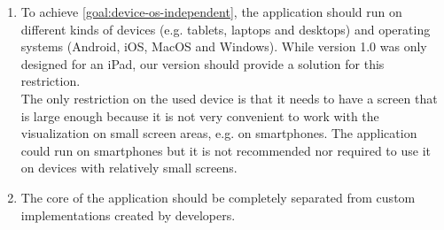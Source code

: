 \begin{enumerate}[label=\textbf{OR \arabic*}., ref=OR \arabic*, labelindent=0.5cm, leftmargin=*]
	\item \label{or:device-os-independent}
		To achieve \ref{goal:device-os-independent}, the application should run on different kinds of devices (e.g. tablets, laptops and desktops) and operating systems (Android, iOS, MacOS and Windows). While version 1.0 was only designed for an iPad, our version should provide a solution for this restriction.\\
	
	The only restriction on the used device is that it needs to have a screen that is large enough because it is not very convenient to work with the visualization on small screen areas, e.g. on smartphones. The application could run on smartphones but it is not recommended nor required to use it on devices with relatively small screens.
	
	\item \label{item:code-separation}
		The core of the application should be completely separated from custom implementations created by developers.

\end{enumerate}

\color{black}
